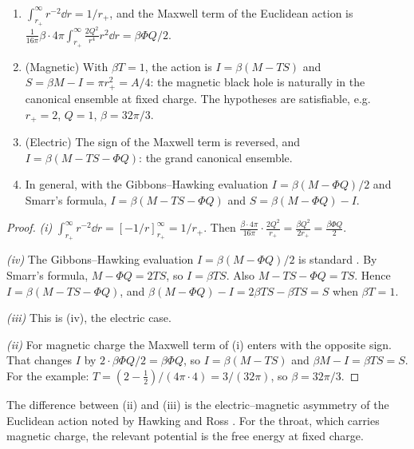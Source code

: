 \begin{theorem}\label{thm:magaction}\ver\
\begin{enumerate}[label=(\roman*)]
\item $\int_{r_+}^\infty r^{-2}\dd r=1/r_+$, and the Maxwell term of the Euclidean action is $\frac1{16\pi}\beta\cdot4\pi\int_{r_+}^\infty\frac{2Q^2}{r^4}r^2\dd r=\beta\Phi Q/2$.
\item (Magnetic) With $\beta T=1$, the action is $I=\beta(M-TS)$ and $S=\beta M-I=\pi r_+^2=A/4$: the magnetic black hole is naturally in the canonical ensemble at fixed charge. The hypotheses are satisfiable, e.g.\ $r_+=2$, $Q=1$, $\beta=32\pi/3$.
\item (Electric) The sign of the Maxwell term is reversed, and $I=\beta(M-TS-\Phi Q)$: the grand canonical ensemble.
\item In general, with the Gibbons--Hawking evaluation $I=\beta(M-\Phi Q)/2$ and Smarr's formula, $I=\beta(M-TS-\Phi Q)$ and $S=\beta(M-\Phi Q)-I$.
\end{enumerate}
\end{theorem}
\begin{proof}
\emph{(i)} $\int_{r_+}^\infty r^{-2}\dd r=[-1/r]_{r_+}^\infty=1/r_+$. Then $\frac{\beta\cdot4\pi}{16\pi}\cdot\frac{2Q^2}{r_+}=\frac{\beta Q^2}{2r_+}=\frac{\beta\Phi Q}2$.

\emph{(iv)} The Gibbons--Hawking evaluation $I=\beta(M-\Phi Q)/2$ is standard \ext. By Smarr's formula, $M-\Phi Q=2TS$, so $I=\beta TS$. Also $M-TS-\Phi Q=TS$. Hence $I=\beta(M-TS-\Phi Q)$, and $\beta(M-\Phi Q)-I=2\beta TS-\beta TS=S$ when $\beta T=1$.

\emph{(iii)} This is (iv), the electric case.

\emph{(ii)} For magnetic charge the Maxwell term of (i) enters with the opposite sign. That changes $I$ by $2\cdot\beta\Phi Q/2=\beta\Phi Q$, so $I=\beta(M-TS)$ and $\beta M-I=\beta TS=S$. For the example: $T=(2-\frac12)/(4\pi\cdot4)=3/(32\pi)$, so $\beta=32\pi/3$.
\end{proof}


The difference between (ii) and (iii) is the electric--magnetic asymmetry of the Euclidean action noted by Hawking and Ross \cite{HawkingRoss1995}. For the throat, which carries magnetic charge, the relevant potential is the free energy at fixed charge.

